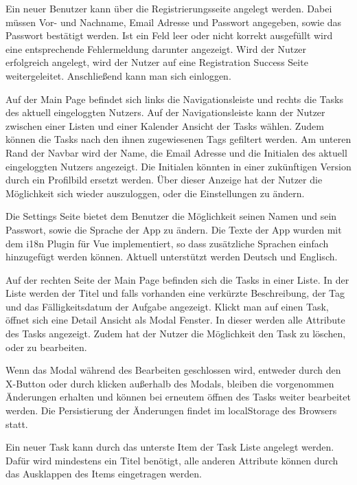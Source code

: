 \documentclass[a4paper, 12pt]{article}
\begin{document}
    Ein neuer Benutzer kann über die Registrierungsseite angelegt werden. Dabei müssen Vor- und Nachname, Email Adresse
    und Passwort angegeben, sowie das Passwort bestätigt werden. Ist ein Feld leer oder nicht korrekt ausgefüllt wird
    eine entsprechende Fehlermeldung darunter angezeigt. Wird der Nutzer erfolgreich angelegt, wird der Nutzer auf eine
    Registration Success Seite weitergeleitet. Anschließend kann man sich einloggen.

    Auf der Main Page befindet sich links die Navigationsleiste und rechts die Tasks des aktuell eingeloggten Nutzers.
    Auf der Navigationsleiste kann der Nutzer zwischen einer Listen und einer Kalender Ansicht der Tasks wählen. Zudem
    können die Tasks nach den ihnen zugewiesenen Tags gefiltert werden. Am unteren Rand der Navbar wird der Name, die
    Email Adresse und die Initialen des aktuell eingeloggten Nutzers angezeigt. Die Initialen könnten in einer
    zukünftigen Version durch ein Profilbild ersetzt werden. Über dieser Anzeige hat der Nutzer die Möglichkeit sich
    wieder auszuloggen, oder die Einstellungen zu ändern.

    Die Settings Seite bietet dem Benutzer die Möglichkeit seinen Namen und sein Passwort, sowie die Sprache der App zu
    ändern. Die Texte der App wurden mit dem i18n Plugin für Vue implementiert, so dass zusätzliche Sprachen einfach
    hinzugefügt werden können. Aktuell unterstützt werden Deutsch und Englisch.

    Auf der rechten Seite der Main Page befinden sich die Tasks in einer Liste. In der Liste werden der Titel und falls
    vorhanden eine verkürzte Beschreibung, der Tag und das Fälligkeitsdatum der Aufgabe angezeigt. Klickt man auf einen
    Task, öffnet sich eine Detail Ansicht als Modal Fenster. In dieser werden alle Attribute des Tasks angezeigt. Zudem
    hat der Nutzer die Möglichkeit den Task zu löschen, oder zu bearbeiten.

    Wenn das Modal während des Bearbeiten geschlossen wird, entweder durch den X-Button oder durch klicken außerhalb des
    Modals, bleiben die vorgenommen Änderungen erhalten und können bei erneutem öffnen des Tasks weiter bearbeitet
    werden. Die Persistierung der Änderungen findet im localStorage des Browsers statt.

    Ein neuer Task kann durch das unterste Item der Task Liste angelegt werden. Dafür wird mindestens ein Titel
    benötigt, alle anderen Attribute können durch das Ausklappen des Items eingetragen werden.
\end{document}
